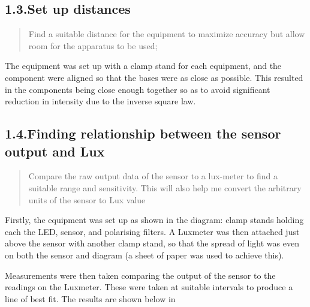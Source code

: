 \documentclass{article}
\begin{document}
\subsection{1.3.\hspace*{0.5em}Set up distances}\label{sec-set-up-distances}%

\begin{quote}%

\noindent{}Find a suitable distance for the equipment to maximize accuracy but allow room for the apparatus to be used;%
\end{quote}%

\noindent{}The equipment was set up with a clamp stand for each equipment, and the component were aligned so that the bases were as close as possible. This resulted in the components being close enough together so as to avoid significant reduction in intensity due to the inverse square law.%

\subsection{1.4.\hspace*{0.5em}Finding relationship between the sensor output and Lux}\label{sec-finding-relationship-between-the-sensor-output-and-lux}%

\begin{quote}%

\noindent{}Compare the raw output data of the sensor to a lux-meter to find a suitable range and sensitivity. This will also help me convert the arbitrary units of the sensor to Lux value%
\end{quote}%

\noindent{}Firstly, the equipment was set up as shown in the diagram: clamp stands holding each the LED, sensor, and polarising filters. A Luxmeter was then attached just above the sensor with another clamp stand, so that the spread of light was even on both the sensor and diagram (a sheet of paper was used to achieve this).%

Measurements were then taken comparing the output of the sensor to the readings on the Luxmeter. These were taken at suitable  intervals to produce a line of best fit. The results are shown below in~%
\end{document}
